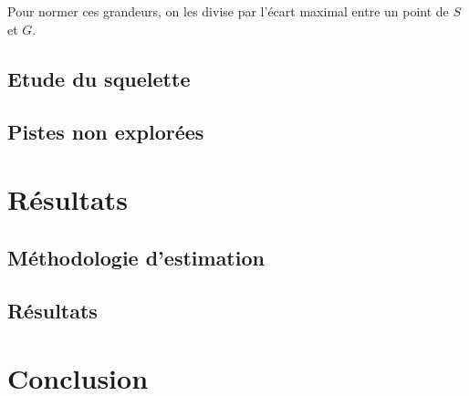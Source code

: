 \documentclass{article}
\begin{document}
      Pour normer ces grandeurs, on les divise par l'écart maximal entre un point de $S$ et $G$.
    
    \subsection{Etude du squelette} %
    
    \subsection{Pistes non explorées}
  
  \section{Résultats} 
  
    \subsection{Méthodologie d'estimation}  %
    
    \subsection{Résultats} %
  
  \section{Conclusion}
  
\end{document}
